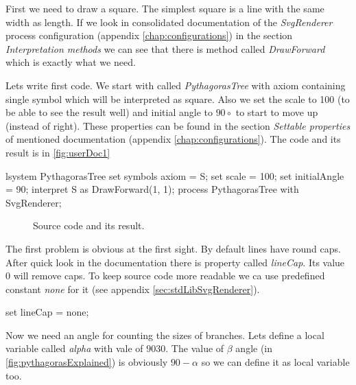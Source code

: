 First we need to draw a square.
The simplest square is a line with the same width as length.
If we look in consolidated documentation of the \emph{SvgRenderer} process configuration (appendix \ref{chap:configurations}) in the section \emph{Interpretation methods} we can see that there is method called \emph{DrawForward} which  is exactly what we need.

Lets write first code.
We start with \lsystem called \emph{PythagorasTree} with axiom containing single symbol which will be interpreted as square.
Also we set the scale to 100 (to be able to see the result well) and initial angle to $90{\circ}$ to start to move up (instead of right).
These properties can be found in the section \emph{Settable properties} of mentioned documentation (appendix \ref{chap:configurations}).
The code and its result is in \autoref{fig:userDoc1}

\newsavebox{\lstBoxUserDocA}
\begin{lrbox}{\lstBoxUserDocA}
\begin{Lsystem60}
lsystem PythagorasTree {
	set symbols axiom = S;
	set scale = 100;
	set initialAngle = 90;
	interpret S as DrawForward(1, 1);
}
process PythagorasTree with SvgRenderer;
\end{Lsystem60}
\end{lrbox}

\begin{figure}[h!]
	\subfloat{
		\usebox{\lstBoxUserDocA}
	} \hfill
	\caption{Source code and its result.}
	\label{fig:userDoc1}
\end{figure}

The first problem is obvious at the first sight.
By default lines have round caps.
After quick look in the documentation there is property called \emph{lineCap}.
Its value 0 will remove caps.
To keep source code more readable we ca use predefined constant \emph{none} for it (see appendix \ref{sec:stdLibSvgRenderer}).

\begin{Lsystem}
set lineCap = none;
\end{Lsystem}

Now we need an angle for counting the sizes of branches.
Lets define a local variable called \emph{alpha} with vale of $90{30}$.
The value of $\beta$ angle (in \autoref{fig:pythagorasExplained}) is obviously $90 - \alpha$ so we can define it as local variable too.

